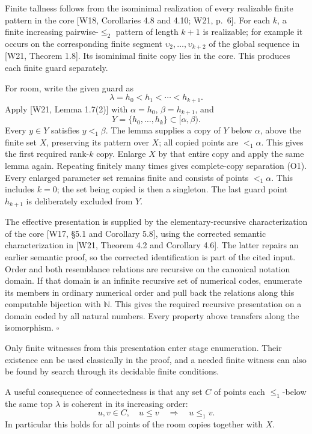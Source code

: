 \documentclass[
  11pt,
  letterpaper,
]{article}
\begin{document}
Finite tallness follows from the isominimal realization of every
realizable finite pattern in the core {[}W18, Corollaries 4.8 and 4.10;
W21, p.~6{]}. For each \(k\), a finite increasing pairwise-\(\leq_2\)
pattern of length \(k+1\) is realizable; for example it occurs on the
corresponding finite segment \(\upsilon_2,\ldots,\upsilon_{k+2}\) of the
global sequence in {[}W21, Theorem 1.8{]}. Its isominimal finite copy
lies in the core. This produces each finite guard separately.

For room, write the given guard as \[
\lambda=h_0<h_1<\cdots<h_{k+1}.
\] Apply {[}W21, Lemma 1.7(2){]} with \(\alpha=h_0\), \(\beta=h_{k+1}\),
and \[
Y=\{h_0,\ldots,h_k\}\subset[\alpha,\beta).
\] Every \(y\in Y\) satisfies \(y<_1\beta\). The lemma supplies a copy
of \(Y\) below \(\alpha\), above the finite set \(X\), preserving its
pattern over \(X\); all copied points are \(<_1\alpha\). This gives the
first required rank-\(k\) copy. Enlarge \(X\) by that entire copy and
apply the same lemma again. Repeating finitely many times gives
complete-copy separation (O1). Every enlarged parameter set remains
finite and consists of points \(<_1\alpha\). This includes \(k=0\); the
set being copied is then a singleton. The last guard point \(h_{k+1}\)
is deliberately excluded from \(Y\).

The effective presentation is supplied by the elementary-recursive
characterization of the core {[}W17, §5.1 and Corollary 5.8{]}, using
the corrected semantic characterization in {[}W21, Theorem 4.2 and
Corollary 4.6{]}. The latter repairs an earlier semantic proof, so the
corrected identification is part of the cited input. Order and both
resemblance relations are recursive on the canonical notation domain. If
that domain is an infinite recursive set of numerical codes, enumerate
its members in ordinary numerical order and pull back the relations
along this computable bijection with \(\mathbb N\). This gives the
required recursive presentation on a domain coded by all natural
numbers. Every property above transfers along the isomorphism.
\(\square\)

Only finite witnesses from this presentation enter stage enumeration.
Their existence can be used classically in the proof, and a needed
finite witness can also be found by search through its decidable finite
conditions.

A useful consequence of connectedness is that any set \(C\) of points
each \(\leq_1\)-below the same top \(\lambda\) is coherent in its
increasing order: \[
u,v\in C,\quad u\leq v
\quad\Longrightarrow\quad u\leq_1v.
\tag{O2}
\] In particular this holds for all points of the room copies together
with \(X\).
\end{document}
